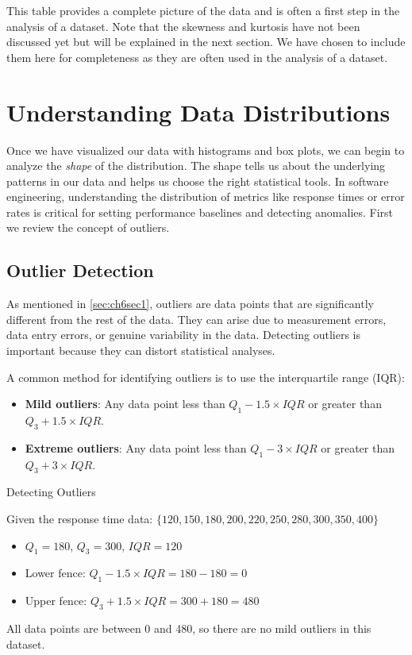 This table provides a complete picture of the data and is often a first step in the analysis of a dataset. Note that the skewness and kurtosis have not been discussed yet but will be explained in the next section. We have chosen to include them here for completeness as they are often used in the analysis of a dataset.


\section{Understanding Data Distributions} \label{sec:data_distributions}
Once we have visualized our data with histograms and box plots, we can begin to analyze the \textit{shape} of the distribution. The shape tells us about the underlying patterns in our data and helps us choose the right statistical tools. In software engineering, understanding the distribution of metrics like response times or error rates is critical for setting performance baselines and detecting anomalies. First we review the concept of outliers.

\subsection*{Outlier Detection}

As mentioned in \autoref{sec:ch6sec1}, outliers are data points that are significantly different from the rest of the data. They can arise due to measurement errors, data entry errors, or genuine variability in the data. Detecting outliers is important because they can distort statistical analyses.

A common method for identifying outliers is to use the interquartile range (IQR):

\begin{itemize}
    \item \textbf{Mild outliers}: Any data point less than $Q_1 - 1.5 \times IQR$ or greater than $Q_3 + 1.5 \times IQR$.
    \item \textbf{Extreme outliers}: Any data point less than $Q_1 - 3 \times IQR$ or greater than $Q_3 + 3 \times IQR$.
\end{itemize}

\begin{example} Detecting Outliers

Given the response time data: $\{120, 150, 180, 200, 220, 250, 280, 300, 350, 400\}$

\begin{itemize}
    \item $Q_1 = 180$, $Q_3 = 300$, $IQR = 120$
    \item Lower fence: $Q_1 - 1.5 \times IQR = 180 - 180 = 0$
    \item Upper fence: $Q_3 + 1.5 \times IQR = 300 + 180 = 480$
\end{itemize}

All data points are between 0 and 480, so there are no mild outliers in this dataset.

\end{example}

